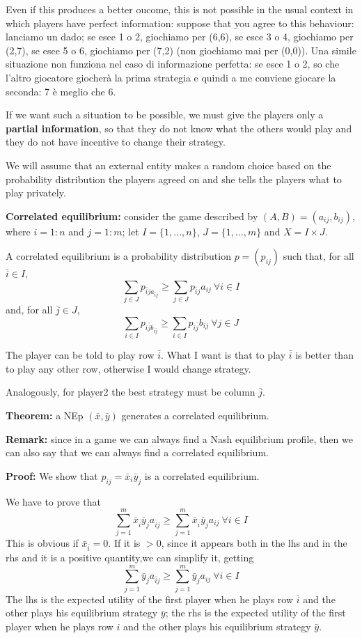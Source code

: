 \noindent Even if this produces a better oucome, this is not possible in 
the usual context in which players have perfect information: suppose that you 
agree to this behaviour: lanciamo un dado; se esce 1 o 2, giochiamo per (6,6), 
se esce 3 o 4, giochiamo per (2,7), se esce 5 o 6, giochiamo per (7,2) (non 
giochiamo mai per (0,0)). Una simile situazione non funziona nel caso di 
informazione perfetta: se esce 1 o 2, so che l'altro giocatore giocherà la 
prima strategia e quindi a me conviene giocare la seconda: 7 è meglio che 6.

\bigskip
\noindent If we want such a situation to be possible, we must give the players only a \textbf{partial information}, so that they do not know what the others would play and they do not have incentive to change their strategy.

\noindent We will assume that an external entity makes a random choice based on the probability distribution the players agreed on and she tells the players what to play privately. 

\bigskip
\noindent \textbf{Correlated equilibrium:} consider the game described by $(A,B) = (a_{ij}, b_{ij})$, where $i=1:n$ and $j=1:m$; let $I = \{1,...,n\}$, $J = \{1,...,m\}$ and $X = I \times J$.

\noindent A correlated equilibrium is a probability distribution $p = (p_{ij})$ such that, for all $\bar{i} \in I$,
\[
	\sum_{j \in J}p_{\bar{i}ja_{\bar{i}j}} \geq \sum_{j \in J}p_{\bar{i}j}a_{ij} ~\forall i \in I
\]
and, for all $\bar{j} \in J$,
\[
\sum_{i \in I}p_{i\bar{j}b_{i\bar{j}}} \geq \sum_{i \in I}p_{i\bar{j}}b_{ij} ~\forall j \in J
\]

\bigskip
\noindent The player can be told to play row $\bar{i}$. What I want is that 
to play $\bar{i}$ is better than to play any other row, otherwise I would 
change strategy.

\noindent Analogously, for player2 the best strategy must be column $\bar{j}$.

\bigskip
\noindent \textbf{Theorem:} a NEp $(\bar{x},\bar{y})$ generates a correlated equilibrium.

\bigskip
\noindent \textbf{Remark:} since in a game we can always find a Nash equilibrium 
profile, then we can also say that we can always find a correlated equilibrium. 

\bigskip
\noindent \textbf{Proof:} We show that $p_{ij} = \bar{x}_i\bar{y}_j$ is a correlated equilibrium.

\noindent We have to prove that
\[
	\sum_{j=1}^m{\bar{x}_{\bar{i}}\bar{y}_ja_{\bar{i}j}} \geq 
	\sum_{j=1}^m{\bar{x}_{\bar{i}}\bar{y}_ja_{ij}} ~\forall i \in I
\]
This is obvious if $\bar{x}_{\bar{i}} = 0$. If it is $> 0$, since it appears both in the lhs and in the rhs and it is a positive quantity,we can simplify it, getting
\[
\sum_{j=1}^m{\bar{y}_ja_{\bar{i}j}} \geq 
\sum_{j=1}^m{\bar{y}_ja_{ij}} ~\forall i \in I
\]
The lhs is the expected utility of the first player when he plays row $\bar{i}$ and the other plays his equilibrium strategy $\bar{y}$; the rhs is the expected utility of the first player when he plays row $i$ and the other plays his equilibrium strategy $\bar{y}$.

